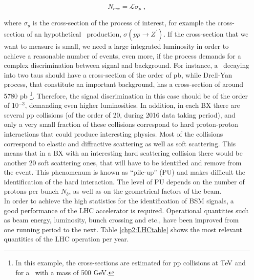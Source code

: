 \begin{equation}
 N_{eve} = \mathscr{L} \sigma_{p} \;,
\end{equation}

\noindent where $\sigma_{p}$ is the cross-section of the process of interest,
for example the cross-section of an hypothetical \Zprime~production, 
$\sigma(pp \rightarrow Z^{\prime})$. If the cross-section that
we want to measure is small, we need a large integrated luminosity
in order to achieve a reasonable number of events, even more, if the process
demands for a complex discrimination between signal and background. For instance, a 
\Zprime~decaying into two taus should have a cross-section of the order of pb, while 
Drell-Yan process, that constitute an important background, has a 
cross-section of around 5780 pb \footnote[7]{In this example, the cross-sections
are estimated for pp collisions at  TeV and for a \Zprime~with a mass of 500 GeV.}.
Therefore, the signal discrimination in this case should be of the order of 10$^{-3}$,
demanding even higher luminosities. In addition, in each BX there are several pp
 collisions (of the order of 20, during 2016 data taking period), and only a very small 
 fraction of these collisions correspond to hard proton-proton interactions that could produce
 interesting physics. Most of the collisions correspond to elastic and diffractive scattering
 as well as soft scattering. This means that in a BX with an interesting hard 
 scattering collision there would be another 20 soft scattering ones, that will have to be 
 identified and remove from the event. This phenomenum is known as “pile-up” 
 (PU) and makes difficult the identification of the hard interaction. The level 
 of PU depends on the number of protons per bunch $N_{b}$, as well as on the geometrical 
 factors of the beam. \\
 
\noindent  In order to achieve the high statistics for the identification of BSM signals, a good performance 
 of the LHC accelerator is required. Operational quantities such as beam energy, luminosity, bunch crossing and etc., 
 have been improved from one running period to the next. Table \ref{chp2:LHCtable}
 shows the most relevant quantities of the LHC operation per year.
 
